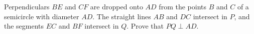 Perpendiculars $BE$ and $CF$ are dropped onto $AD$ from the points $B$ and $C$ of a semicircle with diameter $AD$. The straight lines $AB$ and $DC$ intersect in $P$, and the segments $EC$ and $BF$ intersect in $Q$. Prove that $PQ \perp AD$.
